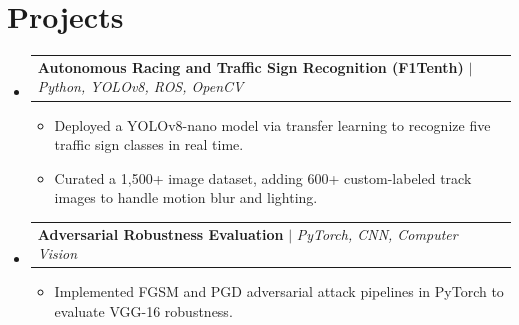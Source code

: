 \documentclass[letterpaper,11pt]{article}
\makeatletter
\newcommand{\resumeItem}[1]{
  \item\small{
    {#1 \vspace{-2pt}}
  }
}
\newcommand{\resumeProjectHeading}[2]{
    \item
    \begin{tabular*}{0.97\textwidth}{l@{\extracolsep{\fill}}r}
      \small#1 & #2 \\
    \end{tabular*}\vspace{-7pt}
}
\newcommand{\resumeSubHeadingListStart}{\begin{itemize}[leftmargin=0.15in, label={}]}
\newcommand{\resumeSubHeadingListEnd}{\end{itemize}}
\newcommand{\resumeItemListStart}{\begin{itemize}[leftmargin=0.2in]}
\newcommand{\resumeItemListEnd}{\end{itemize}\vspace{-5pt}}
\makeatother
\begin{document}
\section{Projects}
\resumeSubHeadingListStart

    \resumeProjectHeading
      {\textbf{Autonomous Racing and Traffic Sign Recognition (F1Tenth)} $|$ \emph{Python, YOLOv8, ROS, OpenCV}}{}
      \resumeItemListStart
        \resumeItem{Deployed a YOLOv8-nano model via transfer learning to recognize five traffic sign classes in real time.}
        \resumeItem{Curated a 1,500+ image dataset, adding 600+ custom-labeled track images to handle motion blur and lighting.}
      \resumeItemListEnd

    \resumeProjectHeading
      {\textbf{Adversarial Robustness Evaluation} $|$ \emph{PyTorch, CNN, Computer Vision}}{}
      \resumeItemListStart
        \resumeItem{Implemented FGSM and PGD adversarial attack pipelines in PyTorch to evaluate VGG-16 robustness.}
      \resumeItemListEnd

\resumeSubHeadingListEnd
\end{document}
